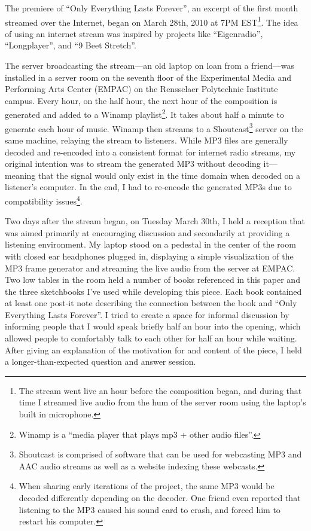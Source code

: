 \documentclass{thesis}
\begin{document}
The premiere of ``Only Everything Lasts Forever'', an excerpt of the first month streamed over the Internet, began on March 28th, 2010 at 7PM EST\footnote{The stream went live an hour before the composition began, and during that time I streamed live audio from the hum of the server room using the laptop's built in microphone.}. The idea of using an internet stream was inspired by projects like ``Eigenradio'', ``Longplayer'', and ``9 Beet Stretch''.

The server broadcasting the stream---an old laptop on loan from a friend---was installed in a server room on the seventh floor of the Experimental Media and Performing Arts Center (EMPAC) on the Rensselaer Polytechnic Institute campus. Every hour, on the half hour, the next hour of the composition is generated and added to a Winamp playlist\footnote{Winamp is a ``media player that plays mp3 + other audio files''\cite{_winamp_????}.}. It takes about half a minute to generate each hour of music. Winamp then streams to a Shoutcast\footnote{Shoutcast is comprised of software that can be used for webcasting MP3 and AAC audio streams as well as a website indexing these webcasts\cite{_shoutcast_????}.} server on the same machine, relaying the stream to listeners. While MP3 files are generally decoded and re-encoded into a consistent format for internet radio streams, my original intention was to stream the generated MP3 without decoding it---meaning that the signal would only exist in the time domain when decoded on a listener's computer. In the end, I had to re-encode the generated MP3s due to compatibility issues\footnote{When sharing early iterations of the project, the same MP3 would be decoded differently depending on the decoder. One friend even reported that listening to the MP3 caused his sound card to crash, and forced him to restart his computer.}.

Two days after the stream began, on Tuesday March 30th, I held a reception that was aimed primarily at encouraging discussion and secondarily at providing a listening environment. My laptop stood on a pedestal in the center of the room with closed ear headphones plugged in, displaying a simple visualization of the MP3 frame generator and streaming the live audio from the server at EMPAC. Two low tables in the room held a number of books referenced in this paper and the three sketchbooks I've used while developing this piece. Each book contained at least one post-it note describing the connection between the book and ``Only Everything Lasts Forever''. I tried to create a space for informal discussion by informing people that I would speak briefly half an hour into the opening, which allowed people to comfortably talk to each other for half an hour while waiting. After giving an explanation of the motivation for and content of the piece, I held a longer-than-expected question and answer session.
\end{document}
